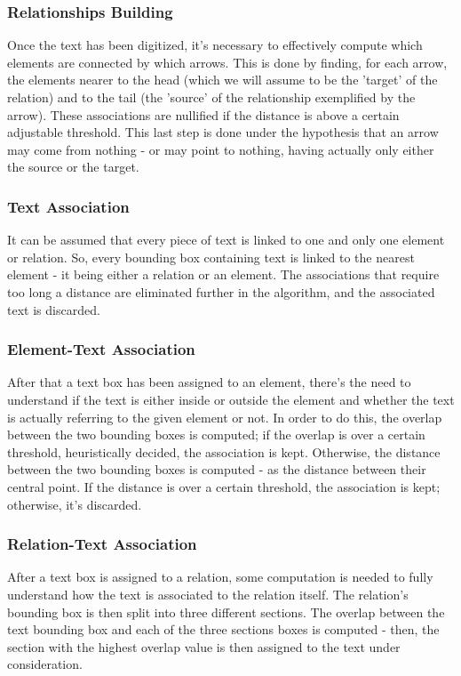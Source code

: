 \documentclass[conference]{IEEEtran}
\begin{document}
\subsubsection{Relationships Building}
Once the text has been digitized, it's necessary to effectively compute which elements are connected by which arrows. This is done by finding, for each arrow, the elements nearer to the head (which we will assume to be the 'target' of the relation) and to the tail (the 'source' of the relationship exemplified by the arrow). These associations are nullified if the distance is above a certain adjustable threshold. This last step is done under the hypothesis that an arrow may come from nothing - or may point to nothing, having actually only either the source or the target. \\

\subsubsection{Text Association}
It can be assumed that every piece of text is linked to one and only one element or relation. So, every bounding box containing text is linked to the nearest element - it being either a relation or an element. The associations that require too long a distance are eliminated further in the algorithm, and the associated text is discarded.\\

\subsubsection{Element-Text Association}
After that a text box has been assigned to an element, there's the need to understand if the text is either inside or outside the element and whether the text is actually referring to the given element or not. In order to do this, the overlap between the two bounding boxes is computed; if the overlap is over a certain threshold, heuristically decided, the association is kept. Otherwise, the distance between the two bounding boxes is computed - as the distance between their central point. If the distance is over a certain threshold, the association is kept; otherwise, it's discarded.\\

\subsubsection{Relation-Text Association}
After a text box is assigned to a relation, some computation is needed to fully understand how the text is associated to the relation itself. The relation's bounding box is then split into three different sections. The overlap between the text bounding box and each of the three sections boxes is computed - then, the section with the highest overlap value is then assigned to the text under consideration. 
\end{document}
